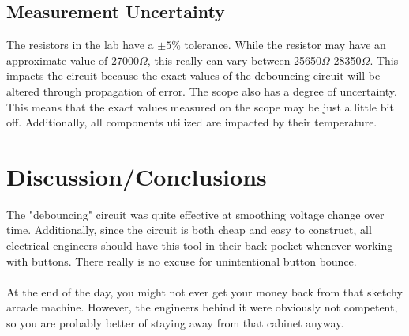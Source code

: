 \documentclass{hitec}
\begin{document}
	
	\subsection{Measurement Uncertainty}
	The resistors in the lab have a $\pm5\%$ tolerance. While the resistor may have an approximate value of 27000$\Omega$, this really can vary between 25650$\Omega$-28350$\Omega$. This impacts the circuit because the exact values of the debouncing circuit will be altered through propagation of error. The scope also has a degree of uncertainty. This means that the exact values measured on the scope may be just a little bit off. Additionally, all components utilized are impacted by their temperature. 
	
	\section{Discussion/Conclusions}
	The "debouncing" circuit was quite effective at smoothing voltage change over time. Additionally, since the circuit is both cheap and easy to construct, all electrical engineers should have this tool in their back pocket whenever working with buttons. There really is no excuse for unintentional button bounce.
	\\
	\\
	\noindent
	At the end of the day, you might not ever get your money back from that sketchy arcade machine. However, the engineers behind it were obviously not competent, so you are probably better of staying away from that cabinet anyway. 
\end{document}
